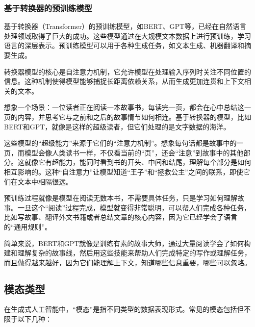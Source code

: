 \subsubsection{基于转换器的预训练模型}

基于转换器（Transformer）的预训练模型，如BERT、GPT等，已经在自然语言处理领域取得了巨大的成功。这些模型通过在大规模文本数据上进行预训练，学习语言的深层表示。预训练模型可以用于各种生成任务，如文本生成、机器翻译和摘要生成。

转换器模型的核心是自注意力机制，它允许模型在处理输入序列时关注不同位置的信息。这种机制使得模型能够捕捉长距离依赖关系，从而生成更加连贯和上下文相关的文本。

想象一个场景：一位读者正在阅读一本故事书，每读完一页，都会在心中总结这一页的内容，并思考它与之前和之后的故事情节如何相连。基于转换器的模型，比如BERT和GPT，就像是这样的超级读者，但它们处理的是文字数据的海洋。

这些模型的“超级能力”来源于它们的“注意力机制”。想象每句话都是故事中的一页，而模型会像人类读书一样，不仅看当前的“页”，还会“注意”到故事中的其他部分。这就像它有超能力，能同时看到书的开头、中间和结尾，理解每个部分是如何相互影响的。这种“自注意力”让模型知道“王子”和“拯救公主”之间的联系，即使它们在文本中相隔很远。

预训练过程就像是模型在阅读无数本书，不需要具体任务，只是学习如何理解故事。一旦这个“阅读”过程完成，模型就变得非常聪明，可以帮人们完成各种任务，比如写故事、翻译外文书籍或者总结文章的核心内容，因为它已经学会了语言的“通用规则”。

简单来说，BERT和GPT就像是训练有素的故事大师，通过大量阅读学会了如何构建和理解复杂的故事线，然后用这些技能来帮助人们完成特定的写作或理解任务，而且做得越来越好，因为它们能理解上下文，知道哪些信息重要，哪些可以忽略。


 

\subsection{模态类型}

在生成式人工智能中，“模态”是指不同类型的数据表现形式。常见的模态包括但不限于以下几种：

